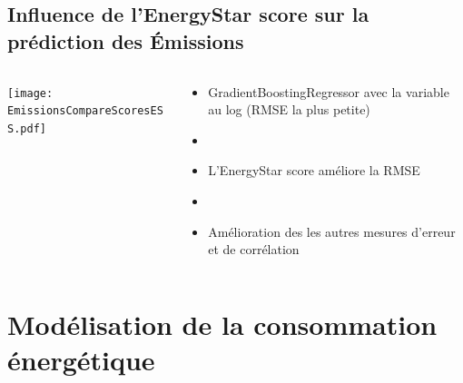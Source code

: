 \documentclass[8pt,aspectratio=169,hyperref={unicode=true}]{beamer}
\begin{document}
\subsection{Influence de l'EnergyStar score sur la prédiction des Émissions}
\begin{frame}{\insertsubsection}
  \begin{columns}
    \begin{column}{.6\textwidth}
      \centering
      \texttt{[image: EmissionsCompareScoresESS.pdf]}
    \end{column}
    \begin{column}{.4\textwidth}
      \begin{itemize}
        \item GradientBoostingRegressor avec la variable au log (RMSE la plus petite)
        \item[]
        \item L'EnergyStar score améliore la RMSE
        \item[]
        \item Amélioration des les autres mesures d'erreur et de corrélation
      \end{itemize}
    \end{column}
  \end{columns}
\end{frame}

\section[Modélisation consommation]{Modélisation de la consommation énergétique}
\end{document}
